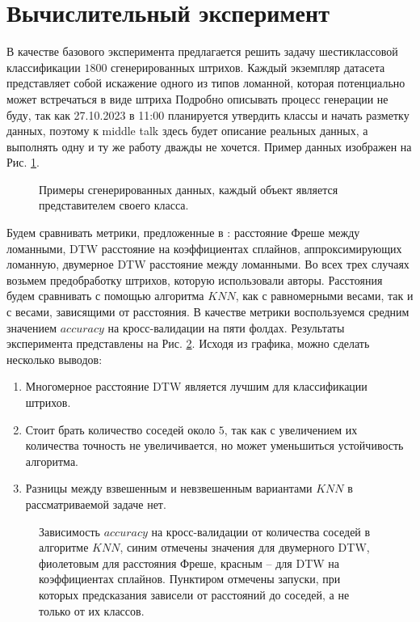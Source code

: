 \documentclass{article}
\begin{document}
\section{Вычислительный эксперимент}
В качестве базового эксперимента предлагается решить задачу шестиклассовой классификации $1800$ сгенерированных штрихов. Каждый экземпляр датасета представляет собой искажение одного из типов ломанной, которая потенциально может встречаться в виде штриха Подробно описывать процесс генерации не буду, так как 27.10.2023 в 11:00 планируется утвердить классы и начать разметку данных, поэтому к middle talk здесь будет описание реальных данных, а выполнять одну и ту же работу дважды не хочется. Пример данных изображен на Рис. \ref{img:data_example}.\\
\begin{figure}[H]
\centering
    
    \caption{Примеры сгенерированных данных, каждый объект является представителем своего класса.}
    \label{img:data_example}
\end{figure}
Будем сравнивать метрики, предложенные в \citep{pronina2023frechet, pazazia2023dtw}: расстояние Фреше между ломанными, DTW расстояние на коэффициентах сплайнов, аппроксимирующих ломанную, двумерное DTW расстояние между ломанными. Во всех трех случаях возьмем предобработку штрихов, которую использовали авторы. Расстояния будем сравнивать с помощью алгоритма $KNN$, как с равномерными весами, так и с весами, зависящими от расстояния. В качестве метрики воспользуемся средним значением $accuracy$ на кросс-валидации на пяти фолдах. Результаты эксперимента представлены на Рис. \ref{img:base_results}. Исходя из графика, можно сделать несколько выводов:
\begin{enumerate}
    \item Многомерное расстояние DTW является лучшим для классификации штрихов.
    \item Стоит брать количество соседей около $5$, так как с увеличением их количества точность не увеличивается, но может уменьшиться устойчивость алгоритма.
    \item Разницы между взвешенным и невзвешенным вариантами $KNN$ в рассматриваемой задаче нет.
\end{enumerate}
\begin{figure}[H]
\centering
    
    \caption{Зависимость $accuracy$ на кросс-валидации от количества соседей в алгоритме $KNN$, синим отмечены значения для двумерного DTW, фиолетовым для расстояния Фреше, красным -- для DTW на коэффициентах сплайнов. Пунктиром отмечены запуски, при которых предсказания зависели от расстояний до соседей, а не только от их классов.}
    \label{img:base_results}
\end{figure}
\end{document}
